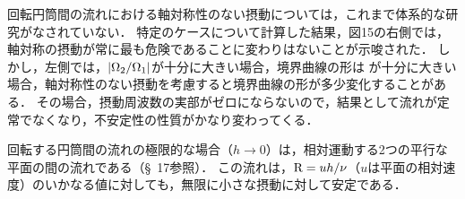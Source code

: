 回転円筒間の流れにおける軸対称性のない摂動については，これまで体系的な研究がなされていない．
特定のケースについて計算した結果，図15の右側では，軸対称の摂動が常に最も危険であることに変わりはないことが示唆された．
しかし，左側では，$\abs{\Omega_2/\Omega_1}$が十分に大きい場合，境界曲線の形は
が十分に大きい場合，軸対称性のない摂動を考慮すると境界曲線の形が多少変化することがある．
その場合，摂動周波数の実部がゼロにならないので，結果として流れが定常でなくなり，不安定性の性質がかなり変わってくる．

回転する円筒間の流れの極限的な場合（$h\to 0$）は，相対運動する2つの平行な平面の間の流れである（\S~17参照）．
この流れは，$\mathrm{R}=uh/\nu$（$u$は平面の相対速度）のいかなる値に対しても，無限に小さな摂動に対して安定である．




\BackToTheToc